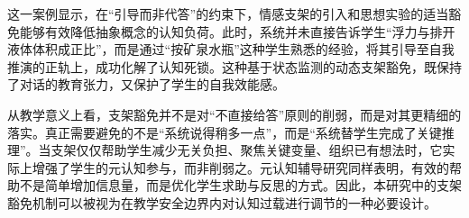 这一案例显示，在“引导而非代答”的约束下，情感支架的引入和思想实验的适当豁免能够有效降低抽象概念的认知负荷。此时，系统并未直接告诉学生“浮力与排开液体体积成正比”，而是通过“按矿泉水瓶”这种学生熟悉的经验，将其引导至自我推演的正轨上，成功化解了认知死锁。这种基于状态监测的动态支架豁免，既保持了对话的教育张力，又保护了学生的自我效能感。

从教学意义上看，支架豁免并不是对“不直接给答”原则的削弱，而是对其更精细的落实。真正需要避免的不是“系统说得稍多一点”，而是“系统替学生完成了关键推理”。当支架仅仅帮助学生减少无关负担、聚焦关键变量、组织已有想法时，它实际上增强了学生的元认知参与，而非削弱之。元认知辅导研究同样表明，有效的帮助不是简单增加信息量，而是优化学生求助与反思的方式\cite{aleven2004toward,roll2011improving}。因此，本研究中的支架豁免机制可以被视为在教学安全边界内对认知过载进行调节的一种必要设计。
